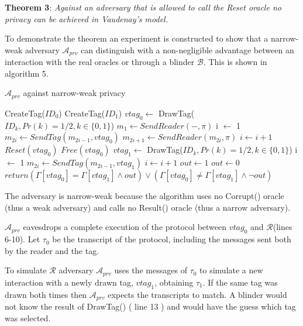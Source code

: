    \textbf{Theorem 3}: \textit{Against an adversary that is allowed to call the Reset oracle no privacy can be achieved in Vaudenay's model.}

    To demonstrate the theorem an experiment is constructed to show that a narrow-weak adversary $\mathcal{A}_{prv}$ can distinguish with a non-negligible advantage 
    between an interaction with the real oracles or through a blinder $\mathcal{B}$. This is shown in algorithm 5.

    \begin{algorithm}[H]
        \centering
        \caption{$\mathcal{A}_{prv}$ against narrow-weak privacy}
        \begin{algorithmic}[1] %
            \State CreateTag($ID_0$)
            \State CreateTag($ID_1$)
            \State $vtag_{0} \leftarrow$ DrawTag($ID_k, Pr(k)= 1/2, k \in \{0,1\}$) 
            \State $m_1 \leftarrow SendReader(-,\pi)$ 
            \State i $\leftarrow$ 1
                \State $m_{2i} \gets SendTag(m_{2i-1}, vtag_{0})$
                \State $m_{2i+1} \gets SendReader(m_{2i}, \pi)$
                \State $i \gets i+1$
            \EndWhile
            \State $Reset(vtag_{0})$
            \State $Free(vtag_{0})$
            \State $vtag_{1} \leftarrow$ DrawTag($ID_k, Pr(k)= 1/2, k \in \{0,1\}$) 
            \State i $\leftarrow$ 1
                \State $m_{2i} \gets SendTag(m_{2i-1}, vtag_{1})$
                \State $i \gets i+1$
            \EndWhile       
                \State $out \leftarrow 1$
            \Else
                \State $out \leftarrow 0$
            \EndIf
            \State $return (\Gamma[vtag_{0}] = \Gamma[vtag_{1}] \land out) \lor 
                (\Gamma[vtag_{0}] \neq \Gamma[vtag_{1}] \land \lnot out)$
        \end{algorithmic}
    \end{algorithm}

    The adversary is narrow-weak because the algorithm uses no Corrupt() oracle (thus a weak adversary) and calls no Result() oracle 
    (thus a narrow adversary).

    $\mathcal{A}_{prv}$ eavesdrops a complete execution of the protocol between $vtag_{0}$ and $\mathcal{R}$(lines 6-10). Let $\tau_{0}$ be the transcript of the protocol, including the messages
    sent both by the reader and the tag.

    To simulate $\mathcal{R}$ adversary $\mathcal{A}_{prv}$ uses the messages of $\tau_{0}$ to simulate a new interaction with a newly drawn tag, $vtag_{1}$, obtaining $\tau_{1}$. If the same tag was
    drawn both times then $\mathcal{A}_{prv}$ expects the transcripts to match. A blinder would not know the result of DrawTag() ( line 13 ) and would have the guess which tag was
    selected. 
    
